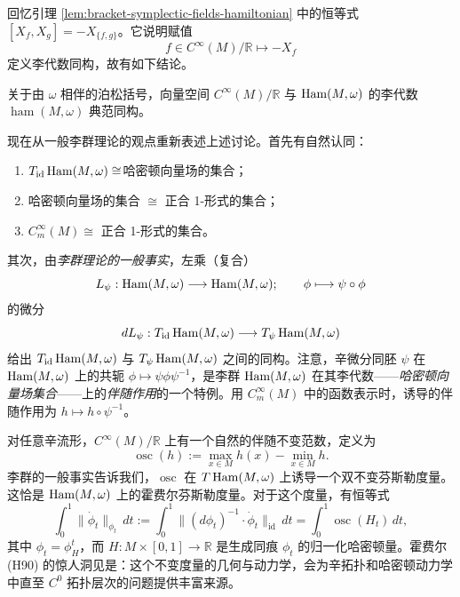 回忆引理 \ref{lem:bracket-symplectic-fields-hamiltonian} 中的恒等式
$[X_f,X_g]=-X_{\{f,g\}}$。它说明赋值
\[
  f\in C^\infty(M)/\mathbb R\longmapsto-X_f
\]
定义李代数同构，故有如下结论。

\begin{proposition}
\label{prop:functions-lie-algebra-ham}
关于由 $\omega$ 相伴的泊松括号，向量空间 $C^\infty(M)/\mathbb R$ 与 $\operatorname{Ham}(M,\omega)$ 的李代数 $\operatorname{ham}(M,\omega)$ 典范同构。
\end{proposition}

现在从一般李群理论的观点重新表述上述讨论。首先有自然认同：
\begin{enumerate}[label=(\arabic*)]
  \item $T_{\operatorname{id}}\operatorname{Ham}(M,\omega)\cong$哈密顿向量场的集合；
  \item 哈密顿向量场的集合 $\cong$ 正合 1-形式的集合；
  \item $C_m^\infty(M)\cong$ 正合 1-形式的集合。
\end{enumerate}
其次，由\emph{李群理论的一般事实}，左乘（复合）
\begin{equation}
  L_\psi:\operatorname{Ham}(M,\omega)\longrightarrow\operatorname{Ham}(M,\omega);
  \qquad\phi\longmapsto\psi\circ\phi
  \label{eq:2.3.25}
\end{equation}
的微分
\[
 dL_\psi:T_{\operatorname{id}}\operatorname{Ham}(M,\omega)
 \longrightarrow T_\psi\operatorname{Ham}(M,\omega)
\]
给出 $T_{\operatorname{id}}\operatorname{Ham}(M,\omega)$ 与 $T_\psi\operatorname{Ham}(M,\omega)$ 之间的同构。注意，辛微分同胚 $\psi$ 在 $\operatorname{Ham}(M,\omega)$ 上的共轭
$\phi\mapsto\psi\phi\psi^{-1}$，是李群 $\operatorname{Ham}(M,\omega)$ 在其李代数——\emph{哈密顿向量场集合}——上的\emph{伴随作用}的一个特例。用 $C_m^\infty(M)$ 中的函数表示时，诱导的伴随作用为
$h\mapsto h\circ\psi^{-1}$。

对任意辛流形，$C^\infty(M)/\mathbb R$ 上有一个自然的伴随不变范数，定义为
\[
  \operatorname{osc}(h):=\max_{x\in M}h(x)-\min_{x\in M}h.
\]
李群的一般事实告诉我们，$\operatorname{osc}$ 在 $T\operatorname{Ham}(M,\omega)$ 上诱导一个双不变芬斯勒度量。这恰是 $\operatorname{Ham}(M,\omega)$ 上的霍费尔芬斯勒度量。对于这个度量，有恒等式
\[
 \int_0^1\|\dot\phi_t\|_{\phi_t}\,dt
 :=\int_0^1\|(d\phi_t)^{-1}\cdot\dot\phi_t\|_{\operatorname{id}}\,dt
 =\int_0^1\operatorname{osc}(H_t)\,dt,
\]
其中 $\phi_t=\phi_H^t$，而 $H:M\times[0,1]\to\mathbb R$ 是生成同痕 $\phi_t$ 的归一化哈密顿量。霍费尔 (H90) 的惊人洞见是：这个不变度量的几何与动力学，会为辛拓扑和哈密顿动力学中直至 $C^0$ 拓扑层次的问题提供丰富来源。

